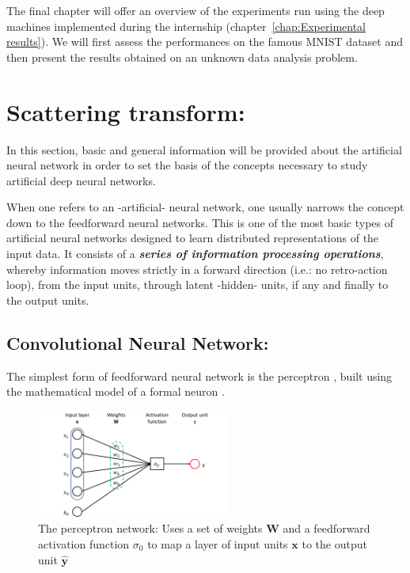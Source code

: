 \documentclass[a4paper,11pt]{report}
\newcommand{\Important}[1]{\textbf{{\em #1}}}
\begin{document}
		The final chapter will offer an overview of the experiments run using the deep machines implemented during the internship (chapter~\ref{chap:Experimental results}). We will first assess the performances on the famous MNIST dataset \cite{LeCun_webPage} and then present the results obtained on an unknown data analysis problem.\\\par
		
\chapter{Scattering transform:}
	\label{chap:Scattering transform}
	In this section, basic and general information will be provided about the artificial neural network in order to set the basis of the concepts necessary to study artificial deep neural networks.\\\par
 
	When one refers to an -artificial- neural network, one usually narrows the concept down to the feedforward neural networks. This is one of the most basic types of artificial neural networks designed to learn distributed representations of the input data. It consists of a \Important{series of information processing operations}, whereby information moves strictly in a forward direction (i.e.: no retro-action loop), from the input units, through latent -hidden- units, if any and finally to the output units. 

	
	\section{Convolutional Neural Network:}
		\label{seq:Artificial neural networks/Perceptron network}
		The simplest form of feedforward neural network is the perceptron \cite{Rosenblatt_1958}, built using the mathematical model of a formal neuron \cite{McCulloch_1943}. \\\par
    
		\begin{figure}[H]
			\begin{center}
				\includegraphics[width=2.5in]{Images/NN/perceptron_network.pdf}
				\caption[The perceptron network]{The perceptron network: Uses a set of weights $\mathbf{W}$ and a feedforward activation function $\sigma_{0}$ to map a layer of input units $\mathbf{x}$ to the output unit $\mathbf{\hat{y}}$}
				\label{fig:The perceptron network}
			\end{center}
		\end{figure}
    
\end{document}
